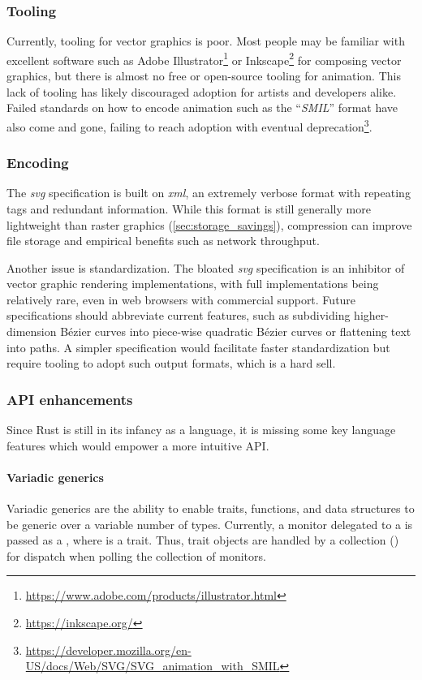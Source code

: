 \subsubsection{Tooling}
Currently, tooling for vector graphics is poor. Most people may be familiar with excellent software such as Adobe Illustrator\footnote{\href{https://www.adobe.com/products/illustrator.html}{https://www.adobe.com/products/illustrator.html}} or Inkscape\footnote{\href{https://inkscape.org/}{https://inkscape.org/}} for composing vector graphics, but there is almost no free or open-source tooling for animation. This lack of tooling has likely discouraged adoption for artists and developers alike. Failed standards on how to encode animation such as the ``\textit{SMIL}'' format have also come and gone, failing to reach adoption with eventual deprecation\footnote{\href{https://developer.mozilla.org/en-US/docs/Web/SVG/SVG_animation_with_SMIL}{https://developer.mozilla.org/en-US/docs/Web/SVG/SVG\_animation\_with\_SMIL}}.\medskip

\subsubsection{Encoding}
The \textit{svg} specification is built on \textit{xml}, an extremely verbose format with repeating tags and redundant information. While this format is still generally more lightweight than raster graphics (\cref{sec:storage_savings}), compression can improve file storage and empirical benefits such as network throughput.\medskip

Another issue is standardization. The bloated \textit{svg} specification is an inhibitor of vector graphic rendering implementations, with full implementations being relatively rare, even in web browsers with commercial support. Future specifications should abbreviate current features, such as subdividing higher-dimension Bézier curves into piece-wise quadratic Bézier curves or flattening text into paths. A simpler specification would facilitate faster standardization but require tooling to adopt such output formats, which is a hard sell.

\subsubsection{API enhancements}
Since Rust is still in its infancy as a language, it is missing some key language features which would empower a more intuitive API.\medskip

\paragraph{Variadic generics}
Variadic generics are the ability to enable traits, functions, and data structures to be generic over a variable number of types. Currently, a monitor delegated to a  is passed as a , where  is a trait. Thus, trait objects are handled by a collection () for dispatch when polling the collection of monitors.\medskip

